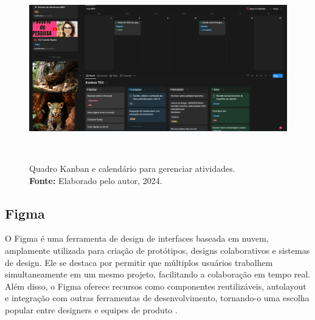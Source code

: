 \begin{figure}[H]
    \centering
    \includegraphics[height=8cm, keepaspectratio]{img/Notion/kanban.png}
    \caption{ Quadro Kanban e calendário para gerenciar atividades. \\
        \textbf{Fonte:} Elaborado pelo autor, 2024.}
    \label{fig:kanban notion}
\end{figure}


\subsection{Figma}
O Figma é uma ferramenta de design de interfaces baseada em nuvem, amplamente utilizada para criação de protótipos, designs colaborativos e sistemas de design. Ele se destaca por permitir que múltiplos usuários trabalhem simultaneamente em um mesmo projeto, facilitando a colaboração em tempo real. Além disso, o Figma oferece recursos como componentes reutilizáveis, autolayout e integração com outras ferramentas de desenvolvimento, tornando-o uma escolha popular entre designers e equipes de produto \citep{figma}.



